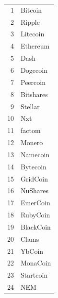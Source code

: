 \documentclass[a5paper, twoside]{book}
\begin{document}
\newpage
{}
\begin{center}
\begin{tabular}{ r | l }
    1 & Bitcoin \\
    2 & Ripple \\
    3 & Litecoin \\
    4 & Ethereum \\
    5 & Dash \\
    6 & Dogecoin \\
    7 & Peercoin \\
    8 & Bitshares \\
    9 & Stellar \\
    10 & Nxt \\
    11 & factom \\
    12 & Monero \\
    13 & Namecoin \\
    14 & Bytecoin \\
    15 & GridCoin \\
    16 & NuShares \\
    17 & EmerCoin \\
    18 & RubyCoin \\
    19 & BlackCoin \\
    20 & Clams \\
    21 & YbCoin \\
    22 & MonaCoin \\
    23 & Startcoin \\
    24 & NEM \\
\end{tabular}
\end{center}
\newpage
\end{document}
